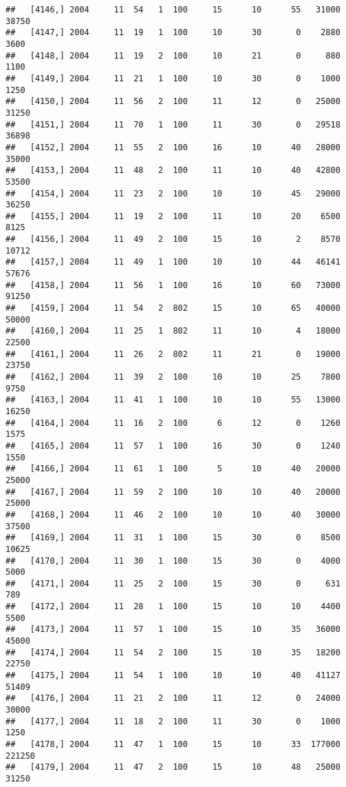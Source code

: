 \documentclass{article}\usepackage[]{graphicx}\usepackage[]{color}
\makeatletter
\newenvironment{kframe}{%
 \def\at@end@of@kframe{}%
 \ifinner\ifhmode%
  \def\at@end@of@kframe{\end{minipage}}%
  \begin{minipage}{\columnwidth}%
 \fi\fi%
 \def\FrameCommand##1{\hskip\@totalleftmargin \hskip-\fboxsep
 \colorbox{shadecolor}{##1}\hskip-\fboxsep
     \hskip-\linewidth \hskip-\@totalleftmargin \hskip\columnwidth}%
 \MakeFramed {\advance\hsize-\width
   \@totalleftmargin\z@ \linewidth\hsize
   \@setminipage}}%
 {\par\unskip\endMakeFramed%
 \at@end@of@kframe}
\newenvironment{knitrout}{}{} %
\makeatother
\begin{document}
\begin{knitrout}
\begin{kframe}
\begin{verbatim}
##   [4146,] 2004     11  54   1  100     15      10      55   31000   38750
##   [4147,] 2004     11  19   1  100     10      30       0    2880    3600
##   [4148,] 2004     11  19   2  100     10      21       0     880    1100
##   [4149,] 2004     11  21   1  100     10      30       0    1000    1250
##   [4150,] 2004     11  56   2  100     11      12       0   25000   31250
##   [4151,] 2004     11  70   1  100     11      30       0   29518   36898
##   [4152,] 2004     11  55   2  100     16      10      40   28000   35000
##   [4153,] 2004     11  48   2  100     11      10      40   42800   53500
##   [4154,] 2004     11  23   2  100     10      10      45   29000   36250
##   [4155,] 2004     11  19   2  100     11      10      20    6500    8125
##   [4156,] 2004     11  49   2  100     15      10       2    8570   10712
##   [4157,] 2004     11  49   1  100     10      10      44   46141   57676
##   [4158,] 2004     11  56   1  100     16      10      60   73000   91250
##   [4159,] 2004     11  54   2  802     15      10      65   40000   50000
##   [4160,] 2004     11  25   1  802     11      10       4   18000   22500
##   [4161,] 2004     11  26   2  802     11      21       0   19000   23750
##   [4162,] 2004     11  39   2  100     10      10      25    7800    9750
##   [4163,] 2004     11  41   1  100     10      10      55   13000   16250
##   [4164,] 2004     11  16   2  100      6      12       0    1260    1575
##   [4165,] 2004     11  57   1  100     16      30       0    1240    1550
##   [4166,] 2004     11  61   1  100      5      10      40   20000   25000
##   [4167,] 2004     11  59   2  100     10      10      40   20000   25000
##   [4168,] 2004     11  46   2  100     10      10      40   30000   37500
##   [4169,] 2004     11  31   1  100     15      30       0    8500   10625
##   [4170,] 2004     11  30   1  100     15      30       0    4000    5000
##   [4171,] 2004     11  25   2  100     15      30       0     631     789
##   [4172,] 2004     11  28   1  100     15      10      10    4400    5500
##   [4173,] 2004     11  57   1  100     15      10      35   36000   45000
##   [4174,] 2004     11  54   2  100     15      10      35   18200   22750
##   [4175,] 2004     11  54   1  100     10      10      40   41127   51409
##   [4176,] 2004     11  21   2  100     11      12       0   24000   30000
##   [4177,] 2004     11  18   2  100     11      30       0    1000    1250
##   [4178,] 2004     11  47   1  100     15      10      33  177000  221250
##   [4179,] 2004     11  47   2  100     15      10      48   25000   31250

\end{verbatim}
\end{kframe}
\end{knitrout}
\end{document}
